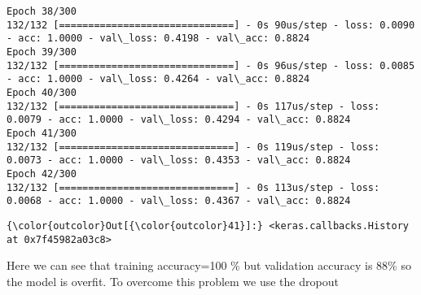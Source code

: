 \documentclass[11pt]{article}
\begin{document}
\begin{Verbatim}[commandchars=\\\{\}]
Epoch 38/300
132/132 [==============================] - 0s 90us/step - loss: 0.0090 - acc: 1.0000 - val\_loss: 0.4198 - val\_acc: 0.8824
Epoch 39/300
132/132 [==============================] - 0s 96us/step - loss: 0.0085 - acc: 1.0000 - val\_loss: 0.4264 - val\_acc: 0.8824
Epoch 40/300
132/132 [==============================] - 0s 117us/step - loss: 0.0079 - acc: 1.0000 - val\_loss: 0.4294 - val\_acc: 0.8824
Epoch 41/300
132/132 [==============================] - 0s 119us/step - loss: 0.0073 - acc: 1.0000 - val\_loss: 0.4353 - val\_acc: 0.8824
Epoch 42/300
132/132 [==============================] - 0s 113us/step - loss: 0.0068 - acc: 1.0000 - val\_loss: 0.4367 - val\_acc: 0.8824

    \end{Verbatim}

\begin{Verbatim}[commandchars=\\\{\}]
{\color{outcolor}Out[{\color{outcolor}41}]:} <keras.callbacks.History at 0x7f45982a03c8>
\end{Verbatim}
            
    Here we can see that training accuracy=100 \% but validation accuracy is
88\% so the model is overfit. To overcome this problem we use the
dropout
\end{document}

